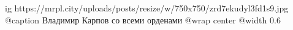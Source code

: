  
 
 
 
 

\ifcmt
  ig https://mrpl.city/uploads/posts/resize/w/750x750/zrd7ekudyl3fd1s9.jpg
	@caption Владимир Карпов со всеми орденами
  @wrap center
  @width 0.6
\fi
